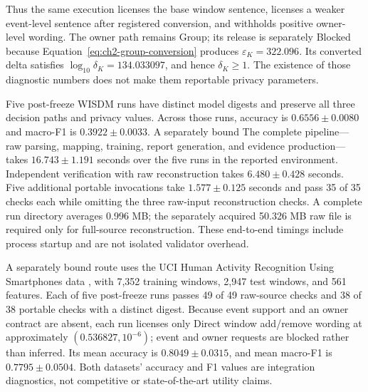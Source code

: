 Thus the same execution licenses the base window sentence, licenses a weaker
event-level sentence after registered conversion, and withholds positive
owner-level wording.  The owner path remains \textsf{Group}; its release is
separately \textsf{Blocked} because Equation~\eqref{eq:ch2-group-conversion}
produces \(\varepsilon_K=322.096\).  Its converted delta satisfies
\(\log_{10}\delta_K=134.033097\), and hence \(\delta_K\geq1\).  The existence of those
diagnostic numbers does not make them reportable privacy parameters.

Five post-freeze WISDM runs have distinct model digests and preserve all three
decision paths and privacy values.  Across those runs, accuracy is
\(0.6556\pm0.0080\) and macro-F1 is \(0.3922\pm0.0033\).  A separately bound
The complete pipeline---raw parsing, mapping, training, report generation, and
evidence production---takes \(16.743\pm1.191\) seconds over the five runs in the
reported environment.  Independent verification with raw reconstruction takes
\(6.480\pm0.428\) seconds.  Five additional portable invocations take
\(1.577\pm0.125\) seconds and pass 35 of 35 checks each while omitting the three
raw-input reconstruction checks.  A complete run directory averages 0.996 MB;
the separately acquired 50.326 MB raw file is required only for full-source
reconstruction.  These end-to-end timings include process startup and are not
isolated validator overhead.

A separately bound route uses the UCI Human Activity Recognition Using Smartphones data
\cite{anguita2013har,reyesortiz2013uci}, with 7,352 training windows, 2,947 test
windows, and 561 features.  Each of five post-freeze runs passes 49 of 49
raw-source checks and 38 of 38 portable checks with a distinct digest.  Because
event support and an owner contract are absent, each run licenses only
\textsf{Direct} window add/remove wording at approximately
\((0.536827,10^{-6})\); event and owner requests are blocked rather than inferred.
Its mean accuracy is \(0.8049\pm0.0315\), and mean macro-F1 is
\(0.7795\pm0.0504\).  Both datasets' accuracy and F1 values are integration
diagnostics, not competitive or state-of-the-art utility claims.

